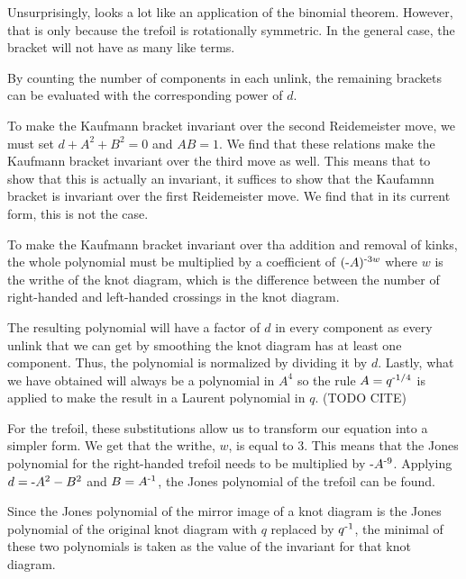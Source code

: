\begin{paper}
Unsurprisingly, \eqTrefoilOne looks a lot like an application of the binomial
theorem.
However, that is only because the trefoil is rotationally symmetric.
In the general case, the bracket will not have as many like terms.

By counting the number of components in each unlink, the remaining
brackets can be evaluated with the corresponding power of $d$.


To make the Kaufmann bracket invariant over the second Reidemeister move, we
must set $d+A^2+B^2=0$ and $AB=1$.
We find that these relations make the Kaufmann bracket invariant over the third
move as well.
This means that to show that this is actually an invariant, it suffices to show
that the Kaufamnn bracket is invariant over the first Reidemeister move.
We find that in its current form, this is not the case.

To make the Kaufmann bracket invariant over tha addition and removal of kinks,
the whole polynomial must be multiplied by a coefficient of
$(\text-A)^{\text-3w}$ where $w$ is the writhe of the knot diagram, which is the
difference between the number of right-handed and left-handed crossings in the
knot diagram.

The resulting polynomial will have a factor of $d$ in every component as every
unlink that we can get by smoothing the knot diagram has at least one component.
Thus, the polynomial is normalized by dividing it by $d$.
Lastly, what we have obtained will always be a polynomial in $A^4$ so the rule
$A=q^{\text-1/4}$ is applied to make the result in a Laurent polynomial in $q$.
(TODO CITE)


For the trefoil, these substitutions allow us to transform our equation into a
simpler form.
We get that the writhe, $w$, is equal to 3.
This means that the Jones polynomial for the right-handed trefoil needs to be
multiplied by $\text-A^{\text-9}$.
Applying $d=\text-A^2-B^2$ and $B=A^{\text-1}$, the Jones polynomial of the
trefoil can be found.


Since the Jones polynomial of the mirror image of a knot diagram is the Jones
polynomial of the original knot diagram with $q$ replaced by $q^{\text-1}$, the
minimal of these two polynomials is taken as the value of the invariant for that
knot diagram.


\end{paper}
